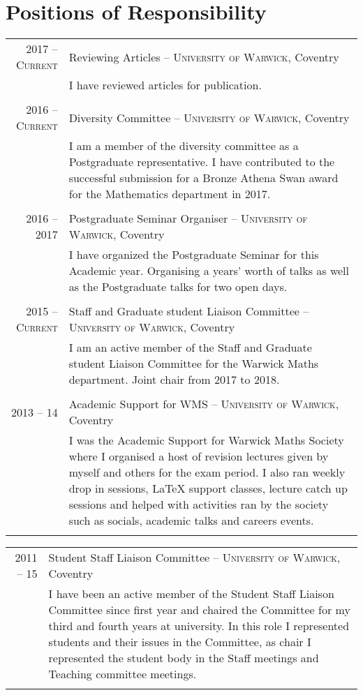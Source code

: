 \documentclass[a4paper,10pt]{article}
\begin{document}
\section{Positions of Responsibility}
\begin{tabular}{r|p{15cm}}
\textsc{2017 -- Current}& Reviewing Articles -- \textsc{University of Warwick}, Coventry\\&\footnotesize{I have reviewed articles for publication.}\\\multicolumn{2}{c}{} \\
\textsc{2016 -- Current}& Diversity Committee -- \textsc{University of Warwick}, Coventry\\&\footnotesize{I am a member of the diversity committee as a Postgraduate representative. I have contributed to the successful submission for a Bronze Athena Swan award for the Mathematics department in 2017.}\\\multicolumn{2}{c}{} \\
\textsc{2016 -- 2017}& Postgraduate Seminar Organiser -- \textsc{University of Warwick}, Coventry\\&\footnotesize{I have organized the Postgraduate Seminar for this Academic year. Organising a years’ worth of talks as well as the Postgraduate talks for two open days.}\\\multicolumn{2}{c}{} \\
\textsc{2015 -- Current}& Staff and Graduate student Liaison Committee -- \textsc{University of Warwick}, Coventry\\&\footnotesize{I am an active member of the Staff and Graduate student Liaison Committee for the Warwick Maths department. Joint chair from 2017 to 2018.}\\\multicolumn{2}{c}{} \\
\textsc{2013 -- 14}& Academic Support for WMS -- \textsc{University of Warwick}, Coventry\\&\footnotesize{I was the Academic Support for Warwick Maths Society where I organised a host of revision lectures given by myself and others for the exam period. I also ran weekly drop in sessions, LaTeX support classes, lecture catch up sessions and helped with activities ran by the society such as socials, academic talks and careers events.}\\\multicolumn{2}{c}{} \\
\end{tabular}
\begin{tabular}{r|p{15cm}}
\hspace{1cm}\textsc{2011 -- 15}& Student Staff Liaison Committee -- \textsc{University of Warwick}, Coventry\\&\footnotesize{I have been an active member of the Student Staff Liaison Committee since first year and chaired the Committee for my third and fourth years at university. In this role I represented students and their issues in the Committee, as chair I represented the student body in the Staff meetings and Teaching committee meetings.}\\\multicolumn{2}{c}{} \\
\end{tabular}
\end{document}
